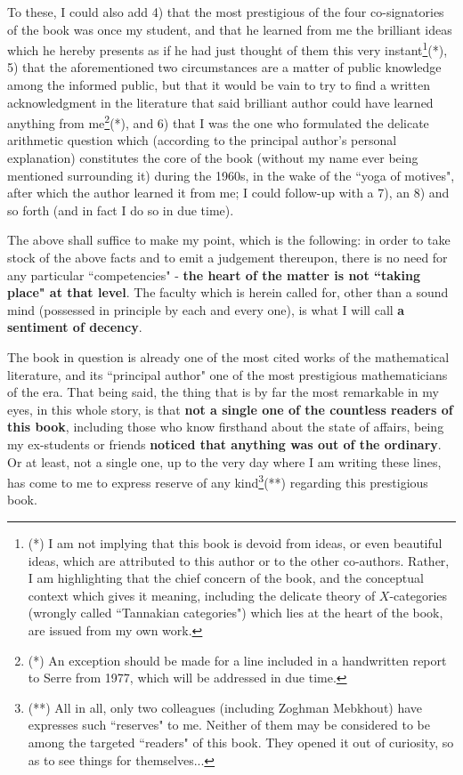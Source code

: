To these, I could also add 4) that the most prestigious of the four co-signatories of the book was once my student, and that he learned from me the brilliant ideas which he hereby presents as if he had just thought of them this very instant\footnote{(*) I am not implying that this book is devoid from ideas, or even beautiful ideas, which are attributed to this author or to the other co-authors. Rather, I am highlighting that the chief concern of the book, and the conceptual context which gives it meaning, including the delicate theory of $X$-categories (wrongly called ``Tannakian categories") which lies at the heart of the book, are issued from my own work.}(*), 5) that the aforementioned two circumstances are a matter of public knowledge among the informed public, but that it would be vain to try to find a written acknowledgment in the literature that said brilliant author could have learned anything from me\footnote{(*) An exception should be made for a line included in a handwritten report to Serre from 1977, which will be addressed in due time.}(*), and 6) that I was the one who formulated the delicate arithmetic question which (according to the principal author's personal explanation) constitutes the core of the book (without my name ever being mentioned surrounding it) during the 1960s, in the wake of the ``yoga of motives", after which the author learned it from me; I could follow-up with a 7), an 8) and so forth (and in fact I do so in due time).

The above shall suffice to make my point, which is the following: in order to take stock of the above facts and to emit a judgement thereupon, there is no need for any particular ``competencies" - \textbf{the heart of the matter is not ``taking place" at that level}. The faculty which is herein called for, other than a sound mind (possessed in principle by each and every one), is what I will call \textbf{a sentiment of decency}.

The book in question is already one of the most cited works of the mathematical literature, and its ``principal author" one of the most prestigious mathematicians of the era. That being said, the thing that is by far the most remarkable in my eyes, in this whole story, is that \textbf{not a single one of the countless readers of this book}, including those who know firsthand about the state of affairs, being my ex-students or friends \textbf{noticed that anything was out of the ordinary}. Or at least, not a single one, up to the very day where I am writing these lines, has come to me to express reserve of any kind\footnote{(**) All in all, only two colleagues (including Zoghman Mebkhout) have expresses such ``reserves" to me. Neither of them may be considered to be among the targeted ``readers" of this book. They opened it out of curiosity, so as to see things for themselves...}(**) regarding this prestigious book.

